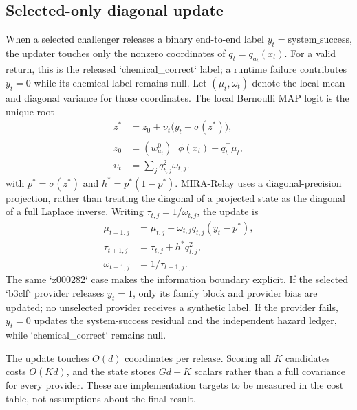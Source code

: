 \documentclass[sigconf,anonymous]{aamas}
\begin{document}
\subsection{Selected-only diagonal update}
When a selected challenger releases a binary end-to-end label $y_t=\mathrm{system\_success}$, the updater touches only the nonzero coordinates of $q_t=q_{a_t}(x_t)$. For a valid return, this is the released `chemical\_correct` label; a runtime failure contributes $y_t=0$ while its chemical label remains null. Let $(\mu_t,\omega_t)$ denote the local mean and diagonal variance for those coordinates. The local Bernoulli MAP logit is the unique root
$$
\begin{aligned}
z^*&=z_0+\upsilon_t\bigl(y_t-\sigma(z^*)\bigr),\\
z_0&=(w_{a_t}^0)^\top\phi(x_t)+q_t^\top\mu_t,\\
\upsilon_t&=\sum_j q_{t,j}^2\omega_{t,j}.
\end{aligned}
$$
with $p^*=\sigma(z^*)$ and $h^*=p^*(1-p^*)$. MIRA-Relay uses a diagonal-precision projection, rather than treating the diagonal of a projected state as the diagonal of a full Laplace inverse. Writing $\tau_{t,j}=1/\omega_{t,j}$, the update is
$$
\begin{aligned}
\mu_{t+1,j}&=\mu_{t,j}+\omega_{t,j}q_{t,j}(y_t-p^*),\\
\tau_{t+1,j}&=\tau_{t,j}+h^*q_{t,j}^2,\\
\omega_{t+1,j}&=1/\tau_{t+1,j}.
\end{aligned}
$$
The same `z000282` case makes the information boundary explicit. If the selected `b3clf` provider releases $y_t=1$, only its family block and provider bias are updated; no unselected provider receives a synthetic label. If the provider fails, $y_t=0$ updates the system-success residual and the independent hazard ledger, while `chemical\_correct` remains null.

The update touches $O(d)$ coordinates per release. Scoring all $K$ candidates costs $O(Kd)$, and the state stores $Gd+K$ scalars rather than a full covariance for every provider. These are implementation targets to be measured in the cost table, not assumptions about the final result.
\end{document}
